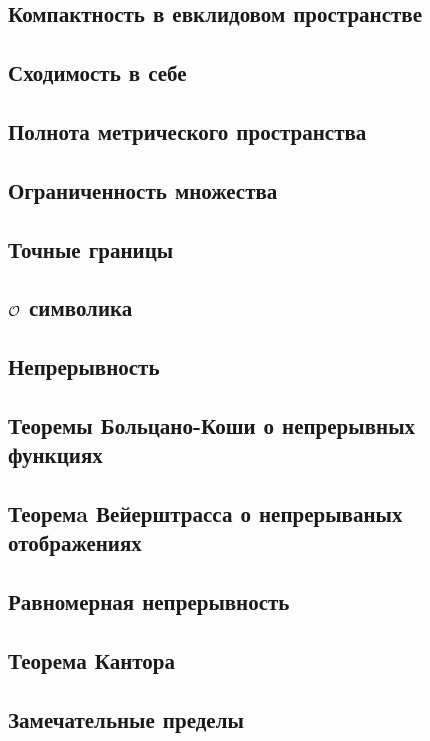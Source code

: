 \subsection{Компактность в евклидовом пространстве}

\skip
\subsection{Сходимость в себе}

\skip
\subsection{Полнота метрического пространства}

\skip
\subsection{Ограниченность множества}

\skip
\subsection{Точные границы}

\skip
\subsection{$\mathcal{O}$ символика}

\skip
\subsection{Непрерывность}

\skip
\subsection{Теоремы Больцано-Коши о непрерывных функциях}

\skip
\subsection{Теоремa Вейерштрасса о непрерываных отображениях}

\skip
\subsection{Равномерная непрерывность}

\skip
\subsection{Теорема Кантора}

\skip
\subsection{Замечательные пределы}

\skip

